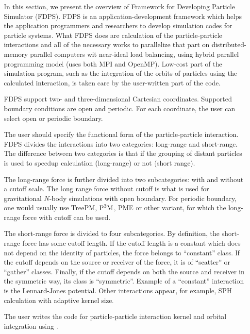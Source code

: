 In this section, we present the overview of Framework for Developing Particle Simulator (FDPS). FDPS is an application-development framework which helps the application programmers and researchers to develop simulation codes for particle systems. What FDPS does are calculation of the particle-particle interactions and all of the necessary  works to parallelize that part on distributed-memory parallel computers wit near-ideal load balancing, using hybrid parallel programming model (uses both MPI and OpenMP). Low-cost part of the simulation program, such as the integration of the orbits of particles using the calculated interaction, is taken care by the user-written part of the code.

FDPS support two- and three-dimensional Cartesian coordinates. Supported boundary conditions are open and periodic. For each coordinate, the user can select  open or periodic boundary.

The user should specify the functional form of the particle-particle interaction. FDPS divides the interactions into two categories: long-range and short-range. The difference between two categories is that if the grouping of distant particles is used to speedup calculation (long-range) or not (short range).

The long-range force is further divided into two subcategories: with and without a cutoff scale. The long range force without cutoff is what is used for gravitational $N$-body simulations with open boundary. For periodic boundary, one would usually use TreePM, $\rm P^3M$, PME or other variant, for which the long-range force with cutoff can be used.

The short-range force is divided to four subcategories. By definition, the short-range force has some cutoff length. If the cutoff length is a constant which does not depend on the identity of particles, the force belongs to ``constant'' class. If the cutoff depends on the source or receiver of the force, it is of ``scatter'' or ``gather'' classes. Finally,  if the cutoff depends on both the source and receiver in the symmetric way, its class is ``symmetric''. Example of a ``constant'' interaction is the Lennard-Jones potential. Other interactions appear, for example, SPH calculation with adaptive kernel size.

The user writes the code for particle-particle interaction kernel and orbital integration using . 
